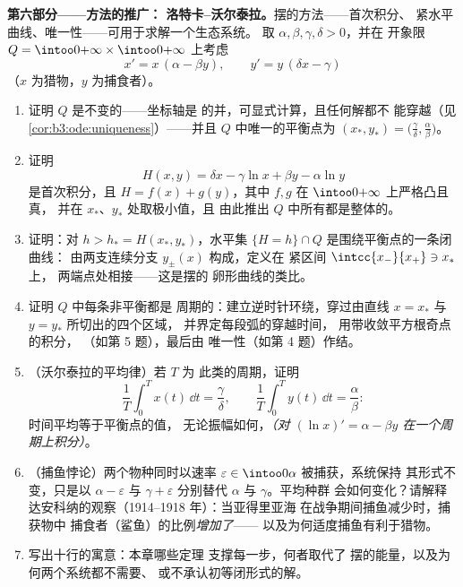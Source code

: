 \begin{problem}
\medskip
\noindent\textbf{第六部分——方法的推广：
洛特卡--沃尔泰拉。}摆的方法——首次积分、
紧水平曲线、唯一性——可用于求解一个生态系统。
取 $\alpha, \beta, \gamma, \delta > 0$，并在
开象限 $Q = \intoo0{+\infty}\times\intoo0{+\infty}$ 上考虑
\[
x' = x\,(\alpha - \beta y), \qquad
y' = y\,(\delta x - \gamma)
\]
（$x$ 为猎物，$y$ 为捕食者）。
\begin{enumerate}[resume]
  \item 证明 $Q$ 是不变的——坐标轴是
        的并，可显式计算，且任何解都不
        能穿越（见\cref{cor:b3:ode:uniqueness}）——并且
        $Q$ 中唯一的平衡点为 $(x_*, y_*) =
        \bigl(\frac\gamma\delta, \frac\alpha\beta\bigr)$。
  \item 证明
        \[
        H(x, y) = \delta x - \gamma\ln x + \beta y -
        \alpha\ln y
        \]
        是首次积分，且 $H = f(x) + g(y)$，其中
        $f, g$ 在 $\intoo0{+\infty}$ 上严格凸且真，
        并在 $x_*$、$y_*$ 处取极小值，且
        由此推出 $Q$ 中所有都是整体的。
  \item 证明：对 $h > h_* = H(x_*, y_*)$，水平集
        $\{H = h\}\cap Q$ 是围绕平衡点的一条闭曲线：
        由两支连续分支 $y_\pm(x)$ 构成，定义在
        紧区间 $\intcc{x_-}{x_+} \ni x_*$ 上，
        两端点处相接——这是摆的
        卵形曲线的类比。
  \item 证明 $Q$ 中每条非平衡都是
        周期的：建立逆时针环绕，穿过由直线
        $x = x_*$ 与 $y = y_*$ 所切出的四个区域，
        并界定每段弧的穿越时间，
        用带收敛平方根奇点的积分，
        （如第 5 题），最后由
        唯一性（如第 4 题）作结。
  \item （沃尔泰拉的平均律）若 $T$ 为
        此类的周期，证明
        \[
        \frac1T\int_0^Tx(t)\,\dd t = \frac\gamma\delta,
        \qquad
        \frac1T\int_0^Ty(t)\,\dd t = \frac\alpha\beta :
        \]
        时间平均等于平衡点的值，
        无论振幅如何，\emph{（对 $(\ln x)' =
        \alpha - \beta y$ 在一个周期上积分）}。
  \item （捕鱼悖论）两个物种同时以速率
        $\varepsilon \in \intoo0\alpha$ 被捕获，系统保持
        其形式不变，只是以 $\alpha - \varepsilon$ 与 $\gamma +
        \varepsilon$ 分别替代 $\alpha$ 与 $\gamma$。平均种群
        会如何变化？请解释
        达安科纳的观察（1914--1918 年）：当亚得里亚海
        在战争期间捕鱼减少时，捕获物中
        捕食者（鲨鱼）的比例\emph{增加了}——
        以及为何适度捕鱼有利于猎物。
  \item 写出十行的寓意：本章哪些定理
        支撑每一步，何者取代了
        摆的能量，以及为何两个系统都不需要、
        或不承认初等闭形式的解。


\end{enumerate}
\end{problem}
